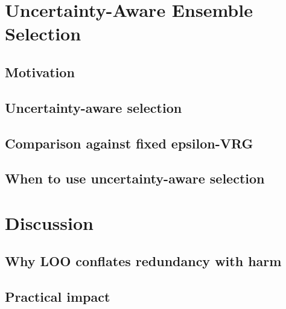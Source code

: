\documentclass[preprint,12pt]{elsarticle}
\begin{document}
\section{Uncertainty-Aware Ensemble Selection}
\label{sec:phase4}

\subsection{Motivation}

\subsection{Uncertainty-aware selection}

\subsection{Comparison against fixed epsilon-VRG}

\subsection{When to use uncertainty-aware selection}

\section{Discussion}
\label{sec:discussion}

\subsection{Why LOO conflates redundancy with harm}

\subsection{Practical impact}
\end{document}
